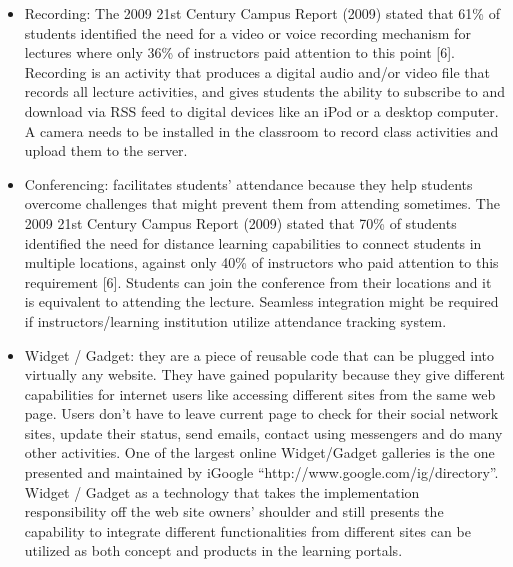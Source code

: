 \documentclass[12pt,a4paper,final,twoside,onecolumn,titlepage]{book}
\begin{document}
\begin{itemize}
\item Recording: The 2009 21st Century Campus Report (2009) stated that 61\% of students identified the need for a video or voice recording mechanism for lectures where only 36\% of instructors paid attention to this point [6]. Recording is an activity that produces a digital audio and/or video file that records all lecture activities, and gives students the ability to subscribe to and download via RSS feed to digital devices like an iPod or a desktop computer. A camera needs to be installed in the classroom to record class activities and upload them to the server. 
\item Conferencing: facilitates students’ attendance because they help students overcome challenges that might prevent them from attending sometimes. The 2009 21st Century Campus Report (2009) stated that 70\% of students identified the need for distance learning capabilities to connect students in multiple locations, against only 40\% of instructors who paid attention to this requirement [6]. Students can join the conference from their locations and it is equivalent to attending the lecture. Seamless integration might be required if instructors/learning institution utilize attendance tracking system.
\item Widget / Gadget: they are a piece of reusable code that can be plugged into virtually any website. They have gained popularity because they give different capabilities for internet users like accessing different sites from the same web page. Users don’t have to leave current page to check for their social network sites, update their status, send emails, contact using messengers and do many other activities. One of the largest online Widget/Gadget galleries is the one presented and maintained by iGoogle “http://www.google.com/ig/directory”. Widget / Gadget as a technology that takes the implementation responsibility off the web site owners’ shoulder and still presents the capability to integrate different functionalities from different sites can be utilized as both concept and products in the learning portals.
\end{itemize}
\end{document}
